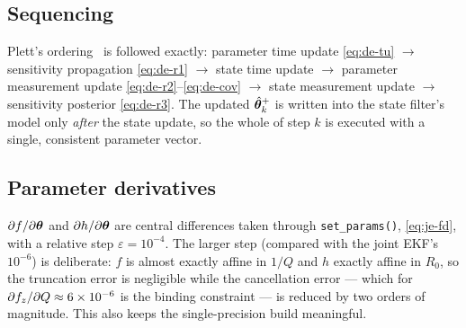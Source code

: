 \subsection{Sequencing}
Plett's ordering~\cite[Part 3, Table 4]{plett2004ekf3} is followed exactly:
parameter time update \eqref{eq:de-tu} $\rightarrow$ sensitivity propagation \eqref{eq:de-r1}
$\rightarrow$ state time update $\rightarrow$ parameter measurement update
\eqref{eq:de-r2}--\eqref{eq:de-cov} $\rightarrow$ state measurement update $\rightarrow$
sensitivity posterior \eqref{eq:de-r3}.  The updated $\hat{\bm{\theta}}^+_k$ is written into the state
filter's model only \emph{after} the state update, so the whole of step $k$ is executed with a
single, consistent parameter vector.

\subsection{Parameter derivatives}
$\partial f/\partial\bm{\theta}$ and $\partial h/\partial\bm{\theta}$ are central differences taken through
\texttt{set\_params()}, \eqref{eq:je-fd}, with a relative step $\varepsilon=10^{-4}$.  The larger
step (compared with the joint EKF's $10^{-6}$) is deliberate: $f$ is almost exactly affine in $1/Q$
and $h$ exactly affine in $R_0$, so the truncation error is negligible while the cancellation error
--- which for $\partial f_z/\partial Q\approx6\times10^{-6}$ is the binding constraint --- is
reduced by two orders of magnitude.  This also keeps the single-precision build meaningful.

